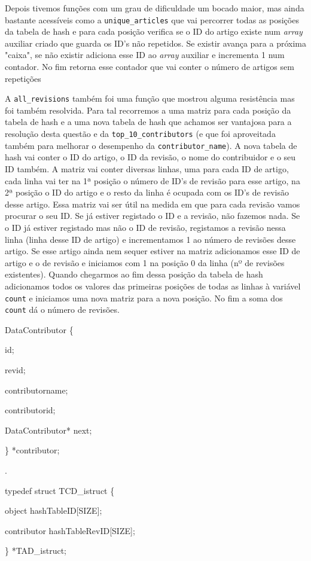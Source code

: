 \documentclass[a4paper,12pt]{report}
\newcommand\tab[1][1cm]{\hspace*{#1}}
\begin{document}
Depois tivemos funções com um grau de dificuldade um bocado maior, mas ainda bastante acessíveis como a {\tt unique\_articles} que vai percorrer todas as posições da tabela de hash e para cada posição verifica se o ID do artigo existe num {\sl array} auxiliar criado que guarda os ID's não repetidos. Se existir avança para a próxima "caixa", se não existir adiciona esse ID ao {\sl array} auxiliar e incrementa 1 num contador. No fim retorna esse contador que vai conter o número de artigos sem repetições

A {\tt all\_revisions} também foi uma função que mostrou alguma resistência mas foi também resolvida. Para tal recorremos a uma matriz para cada posição da tabela de hash e a uma nova tabela de hash que achamos ser vantajosa para a resolução desta questão e da {\tt top\_10\_contributors} (e que foi aproveitada também para melhorar o desempenho da {\tt contributor\_name}). A nova tabela de hash vai conter o ID do artigo, o ID da revisão, o nome do contribuidor e o seu ID também. A matriz vai conter diversas linhas, uma para cada ID de artigo, cada linha vai ter na 1ª posição o número de ID's de revisão para esse artigo, na 2ª posição o ID do artigo e o resto da linha é ocupada com os ID's de revisão desse artigo. Essa matriz vai ser útil na medida em que para cada revisão vamos procurar o seu ID. Se já estiver registado o ID e a revisão, não fazemos nada. Se o ID já estiver registado mas não o ID de revisão, registamos a revisão nessa linha (linha desse ID de artigo) e incrementamos 1 ao número de revisões desse artigo. Se esse artigo ainda nem sequer estiver na matriz adicionamos esse ID de artigo e o de revisão e iniciamos com 1 na posição 0 da linha (nº de revisões existentes). Quando chegarmos ao fim dessa posição da tabela de hash adicionamos todos os valores das primeiras posições de todas as linhas à variável {\tt count} e iniciamos uma nova matriz para a nova posição. No fim a soma dos {\tt count} dá o número de revisões.


\begin{tcolorbox}[width=\textwidth,colback={darkgray},title={\sf Excerto 3.5: Implementação da nova tabela de hash para revisões.},outer arc=2mm,colupper=white]    
	{\footnotesize{} DataContributor \{

		\tab {\color{newpink}long} id;
		
		\tab {\color{newpink}int} revid;

		\tab {\color{newpink}char *} contributorname;
		
		\tab {\color{newpink}int} contributorid;
		
		\tab {\color{newpink}struct} DataContributor{\color{newpink}*} next;
		
		\} {\color{newpink}*}contributor;
		
		{\color{darkgray}.}
		
		{\color{newpink}typedef struct} TCD\_istruct \{
		
		\tab object hashTableID[SIZE];
		
		\tab contributor hashTableRevID[SIZE]; 
		
		\} {\color{newpink}*}TAD\_istruct;
	}
\end{tcolorbox} 
\end{document}
